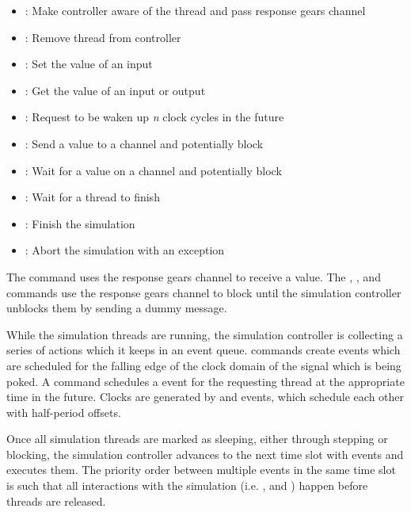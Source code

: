 \begin{itemize}
  \item {}: Make controller aware of the thread and pass response gears channel
  \item {}: Remove thread from controller
  \item {}: Set the value of an input
  \item {}: Get the value of an input or output
  \item {}: Request to be waken up \textit{n} clock cycles in the future
  \item {}: Send a value to a channel and potentially block
  \item {}: Wait for a value on a channel and potentially block
  \item {}: Wait for a thread to finish
  \item {}: Finish the simulation
  \item {}: Abort the simulation with an exception
\end{itemize}

The  command uses the response gears channel to receive a value. The , ,
 and  commands use the response gears channel to block until the simulation
controller unblocks them by sending a dummy message.

While the simulation threads are running, the simulation controller is collecting a series of actions which it keeps
in an event queue.  commands create  events which are scheduled for the falling edge of the
clock domain of the signal which is being poked. A  command schedules a  event for the
requesting thread at the appropriate time in the future. Clocks are generated by  and 
events, which schedule each other with half-period offsets.

Once all simulation threads are marked as sleeping, either through stepping or blocking, the simulation controller
advances to the next time slot with events and executes them. The priority order between multiple events in the same
time slot is such that all interactions with the simulation (i.e. ,  and )
happen before threads are released.


